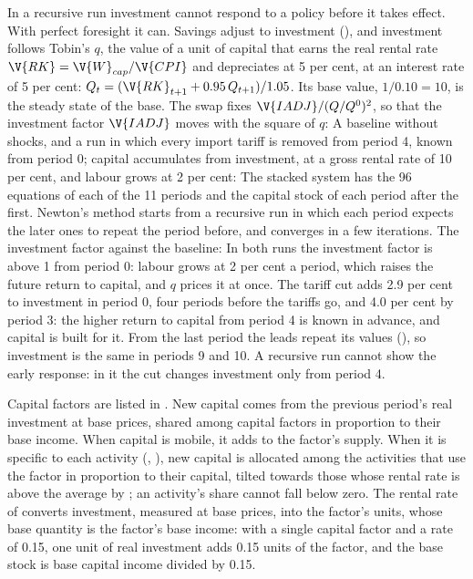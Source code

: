 
In a recursive run investment cannot respond to a policy before it takes
effect. With perfect foresight it can. Savings adjust to investment
(), and investment follows Tobin's $q$, the value of a
unit of capital that earns the real rental rate $\V{RK} = \V{W}_{cap}/\V{CPI}$
and depreciates at 5 per cent, at an interest rate of 5 per cent:
$Q_t = (\V{RK}_{t+1} + 0.95\,Q_{t+1})/1.05$. Its base value, $1/0.10 = 10$,
is the steady state of the base. The swap fixes $\V{IADJ}/(Q/Q^0)^2$, so that
the investment factor $\V{IADJ}$ moves with the square of $q$:
A baseline without shocks, and a run in which every import tariff is removed
from period 4, known from period 0; capital accumulates from investment, at a
gross rental rate of 10 per cent, and labour grows at 2 per cent:
The stacked system has the 96 equations of each of the 11 periods and the
capital stock of each period after the first. Newton's method starts from a
recursive run in which each period expects the later ones to repeat the period
before, and converges in a few iterations. The investment factor against the
baseline:
In both runs the investment factor is above 1 from period 0: labour grows at 2
per cent a period, which raises the future return to capital, and $q$ prices
it at once. The tariff cut adds 2.9 per cent to investment in period 0, four
periods before the tariffs go, and 4.0 per cent by period 3: the higher return
to capital from period 4 is known in advance, and capital is built for it.
From the last period the leads repeat its values (),
so investment is the same in periods 9 and 10. A recursive run cannot show the
early response: in it the cut changes investment only from period 4.


Capital factors are listed in . New capital comes from the
previous period's real investment at base prices, shared among capital
factors in proportion to their base income. When capital is mobile, it adds to
the factor's supply. When it is specific to each activity
(, ), new capital is allocated
among the activities that use the factor in proportion to their capital,
tilted towards those whose rental rate is above the average by
; an activity's share cannot fall below zero. The rental
rate of  converts investment, measured at base prices, into the
factor's units, whose base quantity is the factor's base income: with a
single capital factor and a rate of 0.15, one unit of real investment adds
0.15 units of the factor, and the base stock is base capital income divided
by 0.15.

